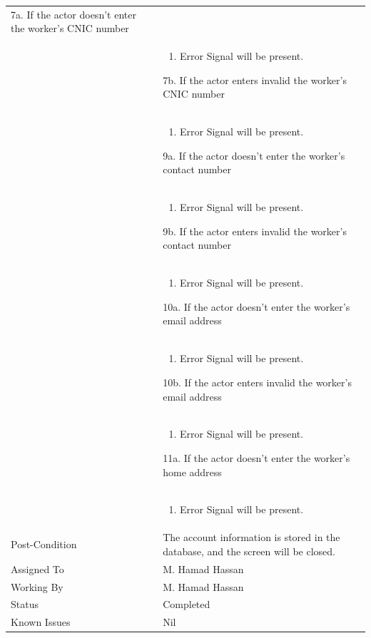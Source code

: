 \documentclass[12pt,a4paper]{article}
\begin{document}
\begin{longtable}{| p{3cm}|p{12cm}|}
7a. If the actor doesn't enter the worker's CNIC number\\ 	
&	\begin{enumerate}
		\item Error Signal will be present.
	\end{enumerate}
7b. If the actor enters invalid the worker's CNIC number\\ 	
&	\begin{enumerate}
		\item Error Signal will be present.
	\end{enumerate}
9a. If the actor doesn't enter the worker's contact number\\ 	
&	\begin{enumerate}
		\item Error Signal will be present.
	\end{enumerate}
9b. If the actor enters invalid the worker's contact number\\ 	
&	\begin{enumerate}
		\item Error Signal will be present.
	\end{enumerate}
10a. If the actor doesn't enter the worker's email address\\ 	
&	\begin{enumerate}
		\item Error Signal will be present.
	\end{enumerate}
10b. If the actor enters invalid the worker's email address\\ 	
&	\begin{enumerate}
		\item Error Signal will be present.
	\end{enumerate}
11a. If the actor doesn't enter the worker's home address\\ 	
&	\begin{enumerate}
		\item Error Signal will be present.
	\end{enumerate}
\\ \hline
Post-Condition & The account information is stored in the database, and the screen will be closed. \\\hline
Assigned To &  M. Hamad Hassan
\\ \hline
Working By &    M. Hamad Hassan
\\ \hline
Status & 	Completed	
\\ \hline
Known Issues & Nil
\\\hline
\end{longtable}
\end{document}
